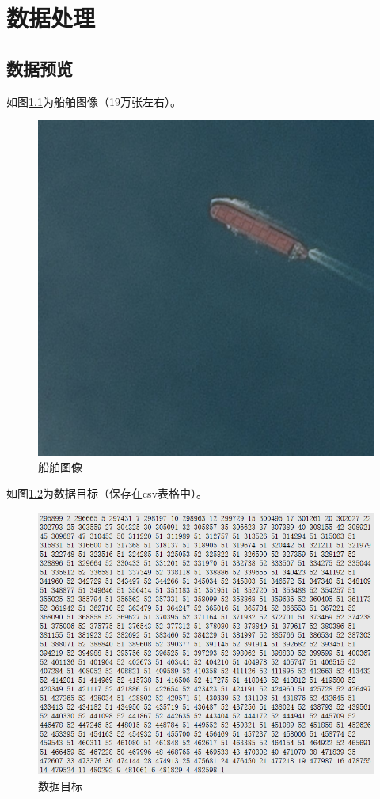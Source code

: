
\chapter{数据处理}

\section{数据预览}

如图\ref{fig::model1}为船舶图像（19万张左右）。

\begin{figure}[htbp]
\centering
\includegraphics[width=0.6\linewidth]{body/model_pic/boat_example}
\caption{船舶图像}
\label{fig::model1}
\end{figure}

如图\ref{fig::model2}为数据目标（保存在csv表格中）。

\begin{figure}[htbp]
\centering
\includegraphics[width=0.9\linewidth]{body/model_pic/target_example}
\caption{数据目标}
\label{fig::model2}
\end{figure}

